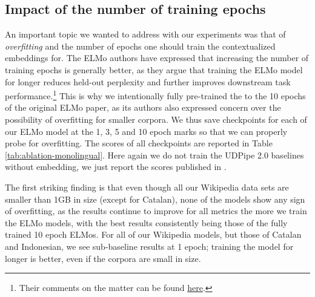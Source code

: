 \subsection{Impact of the number of training epochs}

An important topic we wanted to address with our experiments was that of \emph{overfitting} and the number of epochs one should train the contextualized embeddings for. The ELMo authors have expressed that increasing the number of training epochs is generally better, as they argue that training the ELMo model for longer reduces held-out perplexity and further improves downstream task performance.\footnote{Their comments on the matter can be found \href{https://github.com/allenai/bilm-tf/issues/135}{here}.} This is why we intentionally fully pre-trained the \elmowiki to the 10 epochs of the original ELMo paper, as its authors also expressed concern over the possibility of overfitting for smaller corpora. We thus save checkpoints for each of our ELMo model at the 1, 3, 5 and 10 epoch marks so that we can properly probe for overfitting. The scores of all checkpoints are reported in Table \ref{tab:ablation-monolingual}. Here again we do not train the UDPipe 2.0 baselines without embedding, we just report the scores published in \citet{kondratyuk-straka-2019-75}.

The first striking finding is that even though all our Wikipedia data sets are smaller than 1GB in size (except for Catalan), none of the \elmowiki models show any sign of overfitting, as the results continue to improve for all metrics the more we train the ELMo models, with the best results consistently being those of the fully trained 10 epoch ELMos. For all of our Wikipedia models, but those of Catalan and Indonesian, we see sub-baseline results at 1 epoch; training the model for longer is better, even if the corpora are small in size.

